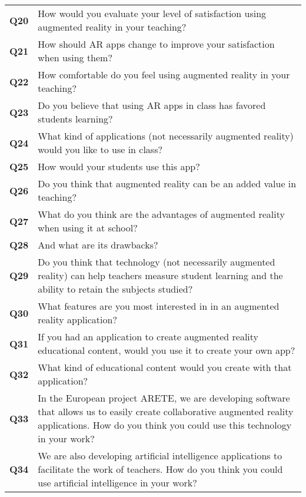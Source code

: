 \begin{longtable}{p{}>{\arraybackslash}p{}}
    \textbf{Q20} & How would you evaluate your level of satisfaction using augmented reality in your teaching? \\
    \textbf{Q21} & How should AR apps change to improve your satisfaction when using them? \\
    \textbf{Q22} & How comfortable do you feel using augmented reality in your teaching? \\
    \textbf{Q23} & Do you believe that using AR apps in class has favored students learning? \\
    \textbf{Q24} & What kind of applications (not necessarily augmented reality)
would you like to use in class? \\
    \textbf{Q25} & How would your students use this app? \\
    \textbf{Q26} & Do you think that augmented reality can be an added value in teaching? \\
    \textbf{Q27} & What do you think are the advantages of augmented reality when using it at school? \\
    \textbf{Q28} & And what are its drawbacks? \\
    \textbf{Q29} & Do you think that technology (not necessarily augmented reality) can help teachers measure student learning and the ability to retain the subjects studied? \\
    \textbf{Q30} & What features are you most interested in in an augmented reality application? \\
    \textbf{Q31} & If you had an application to create augmented reality educational content, would you use it to create your own app? \\
    \textbf{Q32} & What kind of educational content would you create with that application? \\
    \textbf{Q33} & In the European project ARETE, we are developing software that allows us to easily create collaborative augmented reality applications. How do you think you could use this technology
in your work? \\
    \textbf{Q34} & We are also developing artificial intelligence applications to facilitate
the work of teachers. How do you think you could use artificial intelligence in your work? \\
\bottomrule
\end{longtable}
\label{tab:teachersurv}



